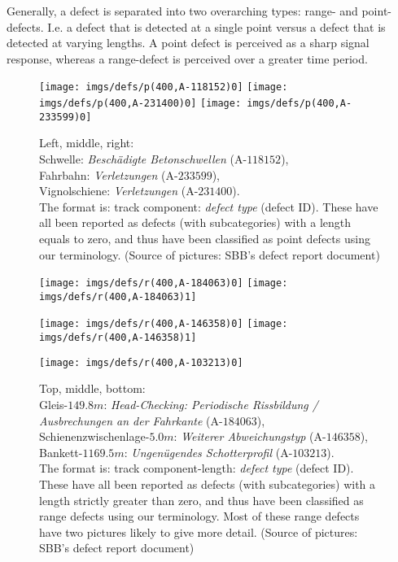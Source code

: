 Generally, a defect is separated into two overarching types: range- and point-defects. I.e. a defect that is detected at a single point versus a defect that is detected at varying lengths. A point defect is perceived as a sharp signal response, whereas a range-defect is perceived over a greater time period. 
\begin{figure}[H]
	\centering
	\texttt{[image: imgs/defs/p(400,A-118152)0]}
	\texttt{[image: imgs/defs/p(400,A-231400)0]}
	\texttt{[image: imgs/defs/p(400,A-233599)0]}
	\caption{Left, middle, right: \\Schwelle: \textit{Beschädigte Betonschwellen} (A-$118152$), \\Fahrbahn: \textit{Verletzungen} (A-$233599$), \\Vignolschiene: \textit{Verletzungen} (A-$231400$). \\The format is: track component: \textit{defect type} (defect ID). These have all been reported as defects (with subcategories) with a length equals to zero, and thus have been classified as point defects using our terminology. (Source of pictures: SBB's defect report document)}
\end{figure}
\raggedbottom
\begin{figure}[H]
	\centering
	\texttt{[image: imgs/defs/r(400,A-184063)0]}
	\texttt{[image: imgs/defs/r(400,A-184063)1]}
	
	\texttt{[image: imgs/defs/r(400,A-146358)0]}
	\texttt{[image: imgs/defs/r(400,A-146358)1]}
\end{figure}
\begin{figure}[H]
	\centering
	\texttt{[image: imgs/defs/r(400,A-103213)0]}
	\caption{Top, middle, bottom:\\ Gleis-$149.8 m$: \textit{Head-Checking: Periodische Rissbildung / Ausbrechungen an der Fahrkante} (A-$184063$),\\ Schienenzwischenlage-$5.0 m$: \textit{Weiterer Abweichungstyp} (A-$146358$), Bankett-$1169.5 m$: \textit{Ungenügendes Schotterprofil} (A-$103213$).\\ The format is: track component-length: \textit{defect type} (defect ID). These have all been reported as defects (with subcategories) with a length strictly greater than zero, and thus have been classified as range defects using our terminology. Most of these range defects have two pictures likely to give more detail. (Source of pictures: SBB's defect report document)}
\end{figure}
